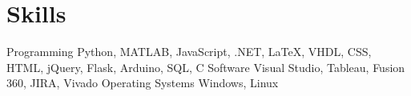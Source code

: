 \section{Skills}

\skills
  {Programming}
  {Python, MATLAB, JavaScript, .NET, LaTeX, VHDL, CSS, HTML, jQuery, Flask, Arduino, SQL, C}
  {Software}
  {Visual Studio, Tableau, Fusion 360, JIRA, Vivado}
  {Operating Systems}
  {Windows, Linux}